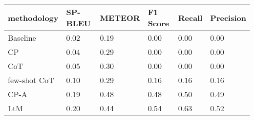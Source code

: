 \begin{tabular}{llllll}
\toprule
methodology & SP-BLEU & METEOR & F1 Score & Recall & Precision \\
\midrule
Baseline & 0.02 & 0.19 & 0.00 & 0.00 & 0.00 \\
CP & 0.04 & 0.29 & 0.00 & 0.00 & 0.00 \\
CoT & 0.05 & 0.30 & 0.00 & 0.00 & 0.00 \\
few-shot CoT & 0.10 & 0.29 & 0.16 & 0.16 & 0.16 \\
CP-A & 0.19 & 0.48 & 0.48 & 0.50 & 0.49 \\
LtM & 0.20 & 0.44 & 0.54 & 0.63 & 0.52 \\
\bottomrule
\end{tabular}

